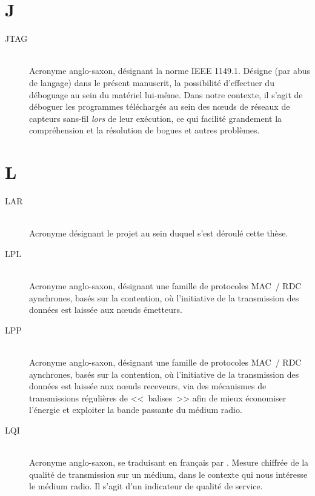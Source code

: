 \section*{J}

\begin{description}

\item[JTAG]  \\
Acronyme anglo-saxon, désignant la norme IEEE 1149.1. Désigne (par abus de
langage) dans le présent manuscrit, la possibilité d'effectuer du déboguage
au sein du matériel lui-même. Dans notre contexte, il s'agit de déboguer
les programmes téléchargés au sein des n{\oe}uds de réseaux de capteurs
sans-fil \emph{lors} de leur exécution, ce qui facilité grandement la
compréhension et la résolution de bogues et autres problèmes.

\end{description}


\section*{L}

\begin{description}

\item[LAR]  \\
Acronyme désignant le projet au sein duquel s'est déroulé cette thèse.

\item[LPL]  \\
Acronyme anglo-saxon, désignant une famille de protocoles MAC~/ RDC
aynchrones, basés sur la contention, où l'initiative de la transmission
des données est laissée aux n{\oe}uds émetteurs.

\item[LPP]  \\
Acronyme anglo-saxon, désignant une famille de protocoles MAC~/ RDC
aynchrones, basés sur la contention, où l'initiative de la transmission
des données est laissée aux n{\oe}uds receveurs, via des mécanismes
de transmissions régulières de <<~balises~>> afin de mieux économiser
l'énergie et exploiter la bande passante du médium radio.

\item[LQI]  \\
Acronyme anglo-saxon, se traduisant en français par . Mesure chiffrée de la qualité de transmission sur un médium,
dans le contexte qui nous intéresse le médium radio. Il s'agit d'un
indicateur de qualité de service.

\end{description}

